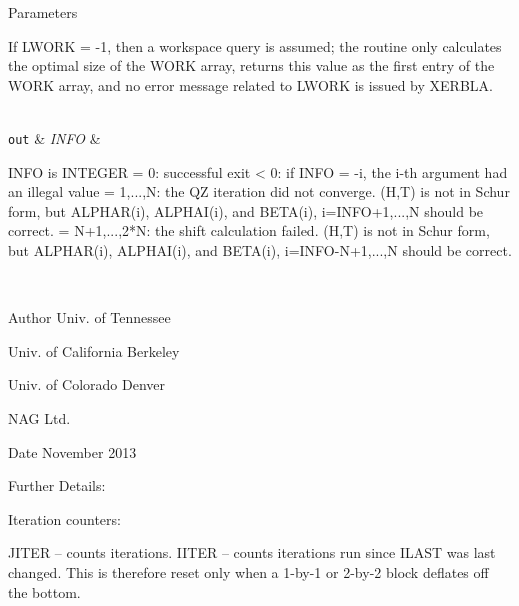 \begin{DoxyParams}[1]{Parameters}
\begin{DoxyVerb}
          If LWORK = -1, then a workspace query is assumed; the routine
          only calculates the optimal size of the WORK array, returns
          this value as the first entry of the WORK array, and no error
          message related to LWORK is issued by XERBLA.\end{DoxyVerb}
\\
\hline
\mbox{\tt out}  & {\em I\+N\+F\+O} & \begin{DoxyVerb}          INFO is INTEGER
          = 0: successful exit
          < 0: if INFO = -i, the i-th argument had an illegal value
          = 1,...,N: the QZ iteration did not converge.  (H,T) is not
                     in Schur form, but ALPHAR(i), ALPHAI(i), and
                     BETA(i), i=INFO+1,...,N should be correct.
          = N+1,...,2*N: the shift calculation failed.  (H,T) is not
                     in Schur form, but ALPHAR(i), ALPHAI(i), and
                     BETA(i), i=INFO-N+1,...,N should be correct.\end{DoxyVerb}
 \\
\hline
\end{DoxyParams}
\begin{DoxyAuthor}{Author}
Univ. of Tennessee 

Univ. of California Berkeley 

Univ. of Colorado Denver 

N\+A\+G Ltd. 
\end{DoxyAuthor}
\begin{DoxyDate}{Date}
November 2013 
\end{DoxyDate}
\begin{DoxyParagraph}{Further Details\+: }
\begin{DoxyVerb}  Iteration counters:

  JITER  -- counts iterations.
  IITER  -- counts iterations run since ILAST was last
            changed.  This is therefore reset only when a 1-by-1 or
            2-by-2 block deflates off the bottom.\end{DoxyVerb}
 
\end{DoxyParagraph}
\hypertarget{group__realGEcomputational_ga3e50914b0060d102e0c71d08ee0d5618}{}
